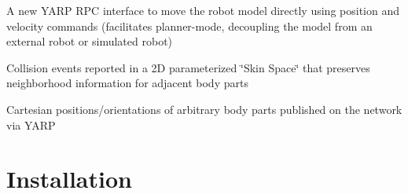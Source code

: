 \begin{DoxyItemize}
\item A new YARP RPC interface to move the robot model directly using position and velocity commands (facilitates planner-\/mode, decoupling the model from an external robot or simulated robot)
\item Collision events reported in a 2D parameterized \char`\"{}Skin Space\char`\"{} that preserves neighborhood information for adjacent body parts
\item Cartesian positions/orientations of arbitrary body parts published on the network via YARP
\end{DoxyItemize}\hypertarget{index_install}{}\section{Installation}\label{index_install}

